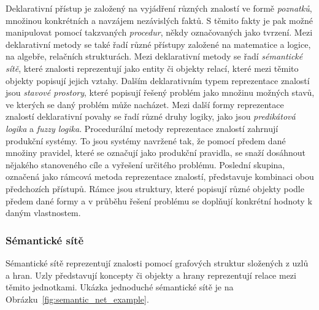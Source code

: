 Deklarativní přístup je založený na vyjádření různých znalostí ve formě \emph{poznatků}, množinou konkrétních a navzájem nezávislých faktů.
S těmito fakty je pak možné manipulovat pomocí takzvaných \emph{procedur}, někdy označovaných jako tvrzení.
Mezi deklarativní metody se také řadí různé přístupy založené na matematice a logice, na algebře, relačních strukturách.
Mezi deklarativní metody se řadí \emph{sémantické sítě}, které znalosti reprezentují jako entity či objekty
relací, které mezi těmito objekty popisují jejich vztahy.
Dalším deklarativním typem reprezentace znalostí jsou \emph{stavové prostory},
které popisují řešený problém jako množinu možných stavů, ve kterých se daný problém může nacházet.
Mezi další formy reprezentace znalostí deklarativní povahy se řadí různé druhy logiky,
jako jsou \emph{predikátová logika} a \emph{fuzzy logika}.
Procedurální metody reprezentace znalostí zahrnují produkční systémy.
To jsou systémy navržené tak, že pomocí předem dané množiny pravidel, které se označují jako produkční pravidla,
se snaží dosáhnout nějakého stanoveného cíle a vyřešení určitého problému.
Poslední skupina, označená jako rámcová metoda reprezentace znalostí, představuje kombinaci obou předchozích přístupů.
Rámce jsou struktury, které popisují různé objekty podle předem dané formy a v průběhu řešení
problému se doplňují konkrétní hodnoty k daným vlastnostem.~\cite{prepreze_znal}

\subsubsection{Sémantické sítě}
Sémantické sítě reprezentují znalosti pomocí grafových struktur složených z uzlů a hran.
Uzly představují koncepty či objekty a hrany reprezentují relace mezi těmito jednotkami.
Ukázka jednoduché sémantické sítě je na Obrázku~\ref{fig:semantic_net_example}.

